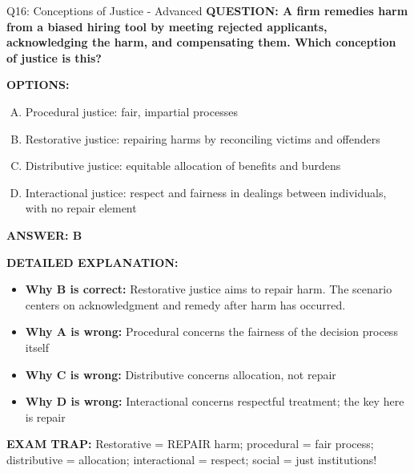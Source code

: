 \documentclass[8pt]{beamer}
\begin{document}
\begin{frame}[shrink=6]{Q16: Conceptions of Justice - Advanced}
\fontsize{6.5}{7.5}\selectfont
\textbf{QUESTION: A firm remedies harm from a biased hiring tool by meeting rejected applicants, acknowledging the harm, and compensating them. Which conception of justice is this?}

\vspace{0.1cm}
\textbf{OPTIONS:}
\begin{enumerate}[A.]
\item Procedural justice: fair, impartial processes
\item Restorative justice: repairing harms by reconciling victims and offenders
\item Distributive justice: equitable allocation of benefits and burdens
\item Interactional justice: respect and fairness in dealings between individuals, with no repair element
\end{enumerate}

\vspace{0.1cm}
\textcolor{myblue}{\textbf{ANSWER: B}}

\vspace{0.1cm}
\textbf{DETAILED EXPLANATION:}
\begin{itemize}
\item \textbf{Why B is correct:} Restorative justice aims to repair harm. The scenario centers on acknowledgment and remedy after harm has occurred.
\item \textbf{Why A is wrong:} Procedural concerns the fairness of the decision process itself
\item \textbf{Why C is wrong:} Distributive concerns allocation, not repair
\item \textbf{Why D is wrong:} Interactional concerns respectful treatment; the key here is repair
\end{itemize}

\textcolor{myred}{\textbf{EXAM TRAP:}} Restorative = REPAIR harm; procedural = fair process; distributive = allocation; interactional = respect; social = just institutions!
\end{frame}
\end{document}
